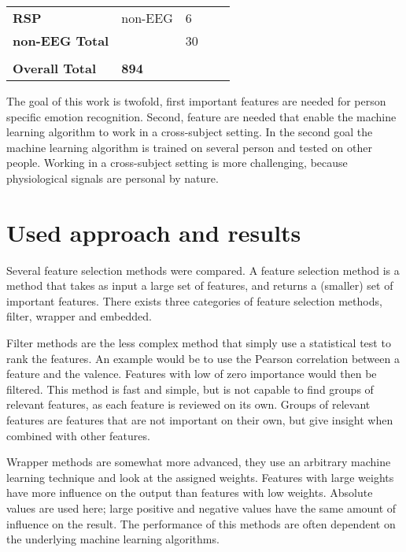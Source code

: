 \documentclass[12pt,journal,compsoc]{IEEEtran}
\newcommand{\npar}{\par \vspace{2.3ex plus 0.3ex minus 0.3ex}}
\begin{document}
\begin{table}[H]
\begin{tabular}{l|llll}
\textbf{RSP}            & non-EEG       & 6                             &                           &              \\
\textbf{non-EEG Total}  &               & 30                            &                           &              \\
                        &               &                               &                           &              \\ \hline
\textbf{Overall Total}  & \textbf{894}  &                               &                           &             
\end{tabular}
\end{table}

The goal of this work is twofold, first important features are needed for person specific emotion recognition. Second, feature are needed that enable the machine learning algorithm to work in a cross-subject setting. In the second goal the machine learning algorithm is trained on several person and tested on other people. Working in a cross-subject setting is more challenging, because physiological signals are personal by nature\citep{DEAP}.

\section{Used approach and results} \label{approach}

Several feature selection methods were compared. A feature selection method is a method that takes as input a large set of features, and returns a (smaller) set of important features. There exists three categories of feature selection methods, filter, wrapper and embedded.

\npar

Filter methods are the less complex method that simply use a statistical test to rank the features. An example would be to use the Pearson correlation between a feature and the valence. Features with low of zero importance would then be filtered. This method is fast and simple, but is not capable to find groups of relevant features, as each feature is reviewed on its own. Groups of relevant features are features that are not important on their own, but give insight when combined with other features.

\npar

Wrapper methods are somewhat more advanced, they use an arbitrary machine learning technique and look at the assigned weights. Features with large weights have more influence on the output than features with low weights. Absolute values are used here; large positive and negative values have the same amount of influence on the result. The performance of this methods are often dependent on the underlying machine learning algorithms.
\end{document}
